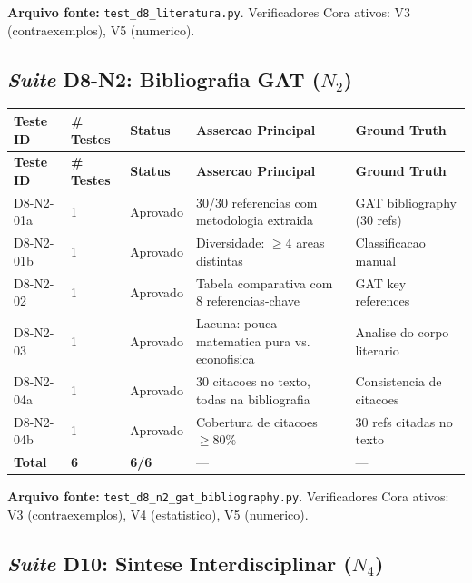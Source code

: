 \textbf{Arquivo fonte:} \texttt{test\_d8\_literatura.py}. Verificadores Cora ativos: V3 (contraexemplos), V5 (numerico).

\subsection{\textit{Suite} D8-N2: Bibliografia GAT ($N_2$)}

\begin{longtable}{|p{2.5cm}|p{2.0cm}|p{2.0cm}|p{3.5cm}|p{3.5cm}|}
\hline
\textbf{Teste ID} & \textbf{\# Testes} & \textbf{Status} & \textbf{Assercao Principal} & \textbf{Ground Truth} \\
\hline
\endfirsthead
\hline
\textbf{Teste ID} & \textbf{\# Testes} & \textbf{Status} & \textbf{Assercao Principal} & \textbf{Ground Truth} \\
\hline
\endhead
\hline
\endfoot
D8-N2-01a & 1 & Aprovado & 30/30 referencias com metodologia extraida & GAT bibliography (30 refs) \\
\hline
D8-N2-01b & 1 & Aprovado & Diversidade: $\geq 4$ areas distintas & Classificacao manual \\
\hline
D8-N2-02 & 1 & Aprovado & Tabela comparativa com 8 referencias-chave & GAT key references \\
\hline
D8-N2-03 & 1 & Aprovado & Lacuna: pouca matematica pura vs. econofisica & Analise do corpo literario \\
\hline
D8-N2-04a & 1 & Aprovado & 30 citacoes no texto, todas na bibliografia & Consistencia de citacoes \\
\hline
D8-N2-04b & 1 & Aprovado & Cobertura de citacoes $\geq 80\%$ & 30 refs citadas no texto \\
\hline
\textbf{Total} & \textbf{6} & \textbf{6/6} & --- & --- \\
\hline
\end{longtable}

\textbf{Arquivo fonte:} \texttt{test\_d8\_n2\_gat\_bibliography.py}. Verificadores Cora ativos: V3 (contraexemplos), V4 (estatistico), V5 (numerico).

\subsection{\textit{Suite} D10: Sintese Interdisciplinar ($N_4$)}

